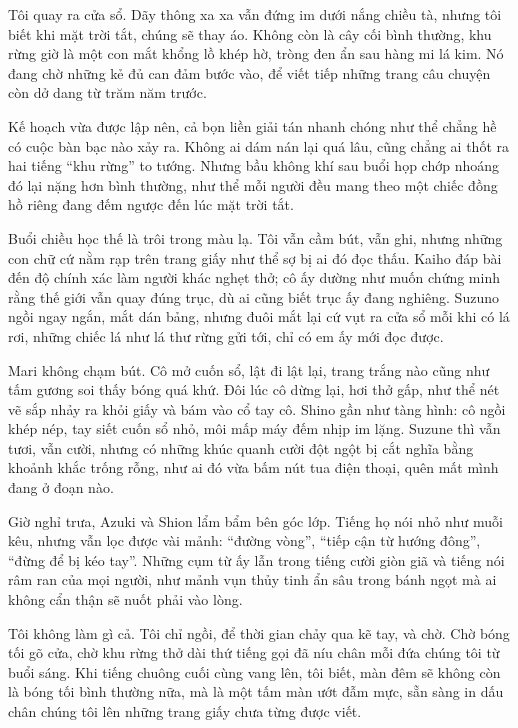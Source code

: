\documentclass[../main.tex]{subfiles}
\begin{document}
Tôi quay ra cửa sổ. Dãy thông xa xa vẫn đứng im dưới nắng chiều tà, nhưng tôi biết khi mặt trời tắt, chúng sẽ thay áo. Không còn là cây cối bình thường, khu rừng giờ là một con mắt khổng lồ khép hờ, tròng đen ẩn sau hàng mi lá kim. Nó đang chờ những kẻ đủ can đảm bước vào, để viết tiếp những trang câu chuyện còn dở dang từ trăm năm trước.

\ct

Kế hoạch vừa được lập nên, cả bọn liền giải tán nhanh chóng như thể chẳng hề có cuộc bàn bạc nào xảy ra. Không ai dám nán lại quá lâu, cũng chẳng ai thốt ra hai tiếng ``khu rừng'' to tướng. Nhưng bầu không khí sau buổi họp chớp nhoáng đó lại nặng hơn bình thường, như thể mỗi người đều mang theo một chiếc đồng hồ riêng đang đếm ngược đến lúc mặt trời tắt.

Buổi chiều học thế là trôi trong màu lạ. Tôi vẫn cầm bút, vẫn ghi, nhưng những con chữ cứ nằm rạp trên trang giấy như thể sợ bị ai đó đọc thấu. Kaiho đáp bài đến độ chính xác làm người khác nghẹt thở; cô ấy dường như muốn chứng minh rằng thế giới vẫn quay đúng trục, dù ai cũng biết trục ấy đang nghiêng. Suzuno ngồi ngay ngắn, mắt dán bảng, nhưng đuôi mắt lại cứ vụt ra cửa sổ mỗi khi có lá rơi, những chiếc lá như lá thư rừng gửi tới, chỉ có em ấy mới đọc được.

Mari không chạm bút. Cô mở cuốn sổ, lật đi lật lại, trang trắng nào cũng như tấm gương soi thấy bóng quá khứ. Đôi lúc cô dừng lại, hơi thở gấp, như thể nét vẽ sắp nhảy ra khỏi giấy và bám vào cổ tay cô. Shino gần như tàng hình: cô ngồi khép nép, tay siết cuốn sổ nhỏ, môi mấp máy đếm nhịp im lặng. Suzune thì vẫn tươi, vẫn cười, nhưng có những khúc quanh cười đột ngột bị cắt nghĩa bằng khoảnh khắc trống rỗng, như ai đó vừa bấm nút tua điện thoại, quên mất mình đang ở đoạn nào.

Giờ nghỉ trưa, Azuki và Shion lẩm bẩm bên góc lớp. Tiếng họ nói nhỏ như muỗi kêu, nhưng vẫn lọc được vài mảnh: ``đường vòng'', ``tiếp cận từ hướng đông'', ``đừng để bị kéo tay''. Những cụm từ ấy lẫn trong tiếng cười giòn giã và tiếng nói râm ran của mọi người, như mảnh vụn thủy tinh ẩn sâu trong bánh ngọt mà ai không cẩn thận sẽ nuốt phải vào lòng.

Tôi không làm gì cả. Tôi chỉ ngồi, để thời gian chảy qua kẽ tay, và chờ. Chờ bóng tối gõ cửa, chờ khu rừng thở dài thứ tiếng gọi đã níu chân mỗi đứa chúng tôi từ buổi sáng. Khi tiếng chuông cuối cùng vang lên, tôi biết, màn đêm sẽ không còn là bóng tối bình thường nữa, mà là một tấm màn ướt đẫm mực, sẵn sàng in dấu chân chúng tôi lên những trang giấy chưa từng được viết.
\end{document}
